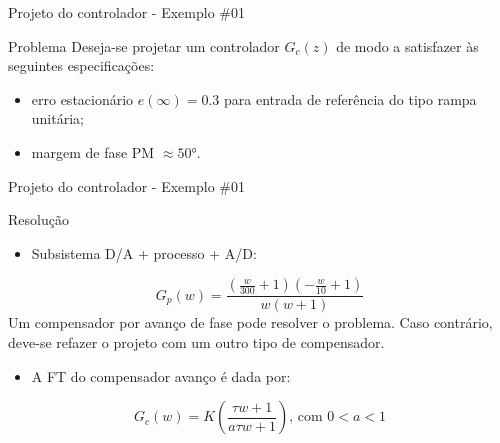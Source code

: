 \begin{frame}{Projeto do controlador - Exemplo \#01}
    \begin{block}{Problema}
    Deseja-se projetar um controlador $G_c(z)$ de modo a satisfazer às seguintes especificações:
    \begin{itemize}
        \item erro estacionário $e(\infty) = \num{0,3}$ para entrada de referência do tipo rampa unitária;
        \item margem de fase PM $\approx \ang{50}$.
    \end{itemize}
    \end{block}
\centering
\vspace{0.5cm}
\scalebox{0.6}{}
\end{frame}

\begin{frame}{Projeto do controlador - Exemplo \#01}
    \begin{block}{Resolução}
\begin{itemize}
    \item Subsistema D/A + processo + A/D:
\end{itemize}
    \begin{equation*}
        G_p(w) = \dfrac{\left(\frac{w}{300} + 1\right) \left(-\frac{w}{10} + 1\right)}{w(w + 1)}
    \end{equation*}
    Um compensador por avanço de fase pode resolver o problema. Caso contrário, deve-se refazer o projeto com um outro tipo de compensador. 
    
    \begin{itemize}
        \item A FT do compensador avanço é dada por:
    \end{itemize}
    \begin{equation*}
        G_c(w) = K{\left(\dfrac{\tau w + 1}{a\tau w + 1}\right)} \text{, com } 0 < a < 1
    \end{equation*}
    \end{block}
\end{frame}

